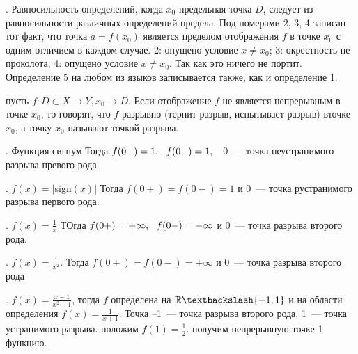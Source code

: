 

. Равносильность определений, когда $x_0$ предельная точка $D$, следует из равносильности различных определений предела. Под номерами 2, 3, 4 записан тот факт, что точка $a = f(x_0)$ является пределом отображения $f$ в точке $x_0$ с одним отличием в каждом случае. 2: опущено условие $x \neq x_0$; 3: окрестность не проколота; 4: опущено условие $x\neq x_0$. Так как это ничего не портит. Определение 5 на любом из языков записывается также, как и определение 1.

\Op пусть $f: D \subset X \to Y, x_0 \to D$. Если отображение $f$ не является непрерывным в точке $x_0$, то говорят, что $f$ разрывно (терпит разрыв, испытывает разрыв)  вточке $x_0$, а точку $x_0$ называют точкой разрыва.

. Функция сигнум
 Тогда $f(0+) = 1,\ \  f(0-) = 1,\ \ $ 0~--- точка неустранимого разрыва превого рода.

. $f(x) = |$sign$(x)|$ Тогда $f(0+) = f(0-) = 1$ и 0~--- точка рустранимого разрыва первого рода.

. $f(x) = \frac 1x$ ТОгда $f(0+) = +\infty,\ \  f(0-) = -\infty$ и 0~--- точка разрыва второго рода.

. $f(x) = \frac 1{x^2}$. Тогда $f(0+) = f(0-) = +\infty$ и 0~--- точка разрыва второго рода

. $f(x) = \frac{x - 1}{x^2 - 1}$, тогда $f$ определена на $\R \bsl \{-1, 1\}$ и на области определения $f(x) = \frac 1{x + 1}$. Точка --1~--- точка разрыва второго рода, 1~--- точка устранимого разрыва. положим $f(1) = \frac 12$. получим непрерывную  точке 1 функцию.